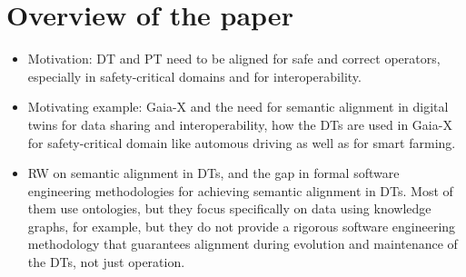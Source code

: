 \section{Overview of the paper}

\begin{itemize}
	\item Motivation: DT and PT need to be aligned for safe and correct operators, especially in safety-critical domains and for interoperability.
	\item Motivating example: Gaia-X and the need for semantic alignment in digital twins for data sharing and interoperability, how the DTs are used in Gaia-X for safety-critical domain like automous driving as well as for smart farming. 
	\item RW on semantic alignment in DTs, and the gap in formal software engineering methodologies for achieving semantic alignment in DTs. Most of them use ontologies, but they focus specifically on data using knowledge graphs, for example, but they do not provide a rigorous software engineering methodology that guarantees alignment during evolution and maintenance of the DTs, not just operation. 
\end{itemize}



